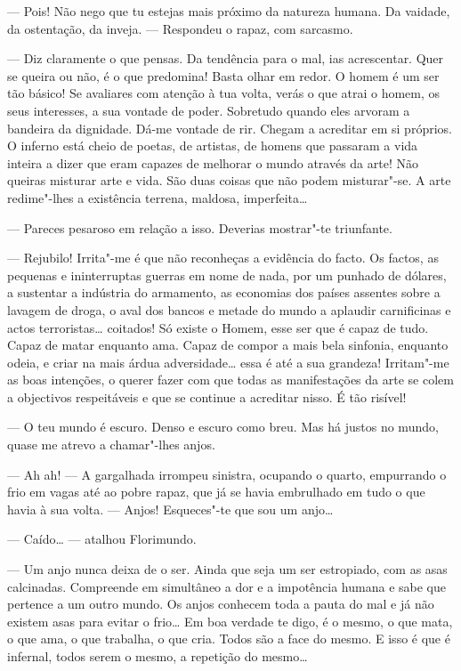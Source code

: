 --- Pois! Não nego que tu estejas mais próximo da natureza humana. Da
vaidade, da ostentação, da inveja. --- Respondeu o rapaz, com sarcasmo.

--- Diz claramente o que pensas. Da tendência para o mal, ias acrescentar.
Quer se queira ou não, é o que predomina! Basta olhar em redor. O homem
é um ser tão básico! Se avaliares com atenção à tua volta, verás o que
atrai o homem, os seus interesses, a sua vontade de poder. Sobretudo
quando eles arvoram a bandeira da dignidade. Dá-me vontade de rir.
Chegam a acreditar em si próprios. O inferno está cheio de poetas, de
artistas, de homens que passaram a vida inteira a dizer que eram capazes
de melhorar o mundo através da arte! Não queiras misturar arte e vida.
São duas coisas que não podem misturar"-se. A arte redime"-lhes a
existência terrena, maldosa, imperfeita\ldots{}

--- Pareces pesaroso em relação a isso. Deverias mostrar"-te triunfante.

--- Rejubilo! Irrita"-me é que não reconheças a evidência do facto. Os
factos, as pequenas e ininterruptas guerras em nome de nada, por um
punhado de dólares, a sustentar a indústria do armamento, as economias
dos países assentes sobre a lavagem de droga, o aval dos bancos e metade
do mundo a aplaudir carnificinas e actos terroristas\ldots{} coitados! Só
existe o Homem, esse ser que é capaz de tudo. Capaz de matar enquanto
ama. Capaz de compor a mais bela sinfonia, enquanto odeia, e criar na
mais árdua adversidade\ldots{} essa é até a sua grandeza! Irritam"-me as boas
intenções, o querer fazer com que todas as manifestações da arte se
colem a objectivos respeitáveis e que se continue a acreditar nisso. É
tão risível!

--- O teu mundo é escuro. Denso e escuro como breu. Mas há justos no
mundo, quase me atrevo a chamar"-lhes anjos.

--- Ah ah! --- A gargalhada irrompeu sinistra, ocupando o quarto, empurrando
o frio em vagas até ao pobre rapaz, que já se havia embrulhado em tudo o
que havia à sua volta. --- Anjos! Esqueces"-te que sou um anjo\ldots{}

--- Caído\ldots{} --- atalhou Florimundo.

--- Um anjo nunca deixa de o ser. Ainda que seja um ser estropiado, com as
asas calcinadas. Compreende em simultâneo a dor e a impotência humana e
sabe que pertence a um outro mundo. Os anjos conhecem toda a pauta do
mal e já não existem asas para evitar o frio\ldots{} Em boa verdade te
digo, é o mesmo, o que mata, o que ama, o que trabalha, o que cria.
Todos são a face do mesmo. E isso é que é infernal, todos serem o mesmo,
a repetição do mesmo\ldots{}

